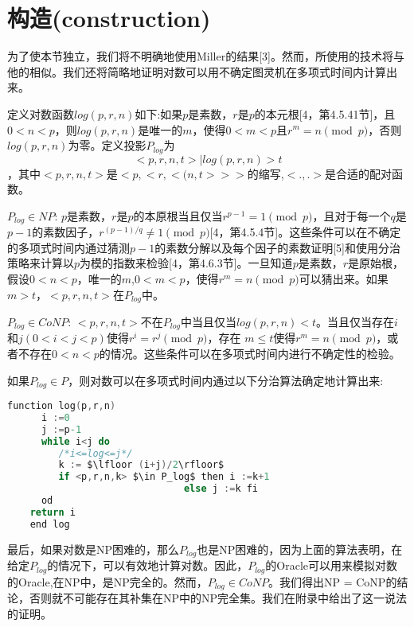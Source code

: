 \documentclass[]{article}
\begin{document}
	
	\section{构造(construction)}
	为了使本节独立，我们将不明确地使用Miller的结果[3]。然而，所使用的技术将与他的相似。我们还将简略地证明对数可以用不确定图灵机在多项式时间内计算出来。\par
	
	定义对数函数$log(p,r,n)$如下:如果$p$是素数，$r$是$p$的本元根[4，第4.5.41节]，且$0<n<p$，则$log (p,r,n)$是唯一的$m$，使得$0<m<p$且$r^m= n\pmod{p}$，否则$log(p,r,n)$为零。定义投影$P_{log}$为
	\[{<p,r,n,t>|log(p,r,n)>t}\]
	，其中$<p, r,n,t>$是$<p,<r,<(n,t>>>$的缩写,$<.,.>$是合适的配对函数。\par
	
	$P_{log}\in NP$: $p$是素数，$r$是$p$的本原根当且仅当$r^{p-1}=1 \pmod{p}$，且对于每一个$q$是$p-1$的素数因子，$r^{(p-1)/q} \neq 1\pmod{p}$[4，第4.5.4节]。这些条件可以在不确定的多项式时间内通过猜测$p-1$的素数分解以及每个因子的素数证明[5]和使用分治策略来计算以$p$为模的指数来检验[4，第4.6.3节]。一旦知道$p$是素数，$r$是原始根，假设$0<n<p$，唯一的$m$,$0<m<p$，使得$r^m=n\pmod{p}$可以猜出来。如果$m>t$，$<p,r,n, t>$在$P_{log}$中。\par
	
	$P_{log}\in CoNP$: $<p,r,n,t>$不在$P_{log}$中当且仅当$log(p,r,n)<t$。当且仅当存在$i$和$j (0 <i<j<p)$使得$r^i=r^j\pmod{p}$，存在
	$m\leq t$使得$r^m=n\pmod{p}$，或者不存在$0<n<p$的情况。这些条件可以在多项式时间内进行不确定性的检验。\par
	
	
	如果$P_{log}\in P$，则对数可以在多项式时间内通过以下分治算法确定地计算出来:\par

	\begin{lstlisting}[language=C,mathescape]
	function log(p,r,n)
	  i :=0
	  j :=p-1
	  while i<j do
	     /*i<=log<=j*/
	     k := $\lfloor (i+j)/2\rfloor$
	     if <p,r,n,k> $\in P_log$ then i :=k+1
	                           else j :=k fi
	  od
	return i
	end log
	\end{lstlisting}
	\par
	
	最后，如果对数是NP困难的，那么$P_{log}$也是NP困难的，因为上面的算法表明，在给定$P_{log}$的情况下，可以有效地计算对数。因此，$P_{log}$的Oracle可以用来模拟对数的Oracle,在NP中，是NP完全的。然而，$P_{log} \in CoNP$。我们得出NP = CoNP的结论，否则就不可能存在其补集在NP中的NP完全集。我们在附录中给出了这一说法的证明。\par
	
\end{document}
